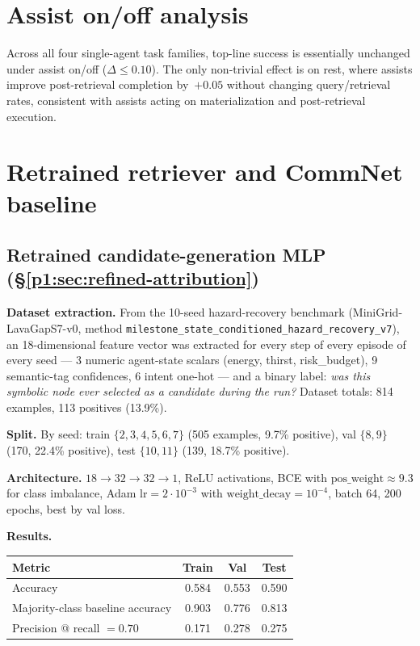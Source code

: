 \documentclass{article}
\begin{document}
\section{Assist on/off analysis}
\label{p1:app:assist}

Across all four single-agent task families, top-line success is essentially unchanged under assist on/off ($\Delta \le 0.10$). The only non-trivial effect is on rest, where assists improve post-retrieval completion by~$+0.05$ without changing query/retrieval rates, consistent with assists acting on materialization and post-retrieval execution.

\section{Retrained retriever and CommNet baseline}
\label{p1:app:learned-baselines}

\subsection{Retrained candidate-generation MLP (\S\ref{p1:sec:refined-attribution})}

\textbf{Dataset extraction.} From the 10-seed hazard-recovery benchmark
(MiniGrid-LavaGapS7-v0, method \texttt{milestone\_state\_conditioned\_hazard\_recovery\_v7}),
an 18-dimensional feature vector was extracted for every step of every episode of every seed --- 3 numeric agent-state scalars (energy, thirst, risk\_budget),
9 semantic-tag confidences, 6 intent one-hot --- and a binary label: \emph{was
this symbolic node ever selected as a candidate during the run?} Dataset
totals: 814 examples, 113 positives (13.9\%).

\textbf{Split.} By seed: train $\{2,3,4,5,6,7\}$ (505 examples, 9.7\% positive),
val $\{8,9\}$ (170, 22.4\% positive), test $\{10,11\}$ (139, 18.7\% positive).

\textbf{Architecture.} $18 \to 32 \to 32 \to 1$, ReLU activations, BCE with
$\text{pos\_weight}\!\approx\!9.3$ for class imbalance, Adam $\text{lr}=2{\cdot}10^{-3}$
with $\text{weight\_decay}=10^{-4}$, batch 64, 200 epochs, best by val loss.

\textbf{Results.}

\begin{table}[h]
\centering
\small
\begin{tabular}{l c c c}
\toprule
Metric & Train & Val & Test \\
\midrule
Accuracy                          & 0.584 & 0.553 & 0.590 \\
Majority-class baseline accuracy  & 0.903 & 0.776 & 0.813 \\
Precision @ recall $=0.70$        & 0.171 & 0.278 & 0.275 \\
\bottomrule
\end{tabular}
\end{table}
\end{document}
